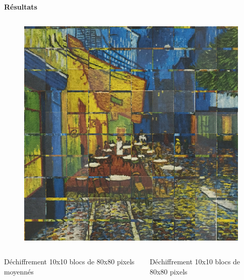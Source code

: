 \documentclass{beamer}
\begin{document}
\begin{frame}[t]
\begin{columns}[t]
\begin{column}{.5\linewidth}
\begin{block}{\centering \textbf{Résultats}}
\begin{columns}[t]
                        \begin{column}{.2\linewidth}
                            \begin{figure}[t]
                                \includegraphics[width=\linewidth]{rsc/van_gogh_picture_10_d.png}\\
                            \end{figure}
                        \end{column}
                    \end{columns}

                    \begin{columns}[t]
                        \begin{column}{.5\linewidth}
                            \begin{center}
                                {\small Déchiffrement 10x10 blocs de 80x80 pixels moyennés}
                            \end{center}
                        \end{column}

                        \begin{column}{.5\linewidth}
                            \begin{center}
                                {\small Déchiffrement 10x10 blocs de 80x80 pixels}
                            \end{center}
                        \end{column}
                    \end{columns}


\end{block}
\end{column}
\end{columns}
\end{frame}
\end{document}
